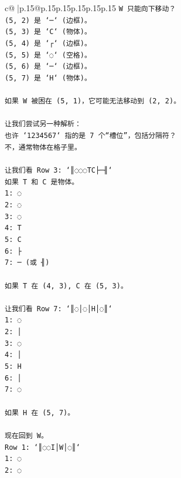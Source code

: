 \documentclass{article}
\begin{document}
{\begin{supertabular}{c@{$\;$}|p{.15\linewidth}@{}p{.15\linewidth}p{.15\linewidth}p{.15\linewidth}p{.15\linewidth}p{.15\linewidth}}
{{{\texttt{W 只能向下移动？} \\
\texttt{(5, 2) 是 `─` (边框)。} \\
\texttt{(5, 3) 是 `C` (物体)。} \\
\texttt{(5, 4) 是 `┌` (边框)。} \\
\texttt{(5, 5) 是 `◌` (空格)。} \\
\texttt{(5, 6) 是 `─` (边框)。} \\
\texttt{(5, 7) 是 `H` (物体)。} \\
\\ 
\texttt{如果 W 被困在 (5, 1)，它可能无法移动到 (2, 2)。} \\
\\ 
\texttt{让我们尝试另一种解析：} \\
\texttt{也许 `1234567` 指的是 7 个“槽位”，包括分隔符？} \\
\texttt{不，通常物体在格子里。} \\
\\ 
\texttt{让我们看 Row 3: `║◌◌◌TC├─╢`} \\
\texttt{如果 T 和 C 是物体。} \\
\texttt{1: ◌} \\
\texttt{2: ◌} \\
\texttt{3: ◌} \\
\texttt{4: T} \\
\texttt{5: C} \\
\texttt{6: ├} \\
\texttt{7: ─ (或 ╢)} \\
\\ 
\texttt{如果 T 在 (4, 3), C 在 (5, 3)。} \\
\\ 
\texttt{让我们看 Row 7: `║◌│◌│H│◌║`} \\
\texttt{1: ◌} \\
\texttt{2: │} \\
\texttt{3: ◌} \\
\texttt{4: │} \\
\texttt{5: H} \\
\texttt{6: │} \\
\texttt{7: ◌} \\
\\ 
\texttt{如果 H 在 (5, 7)。} \\
\\ 
\texttt{现在回到 W。} \\
\texttt{Row 1: `║◌◌I│W│◌║`} \\
\texttt{1: ◌} \\
\texttt{2: ◌} \\
}}}
\end{supertabular}}
\end{document}
